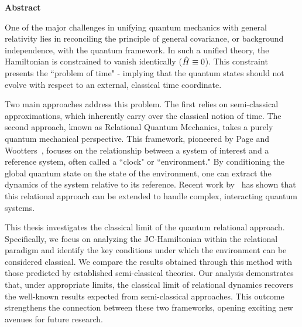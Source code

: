\begin{center}
    {\Large\bfseries\sffamily Abstract}
\end{center}

One of the major challenges in unifying quantum mechanics with general relativity lies in reconciling the principle of general covariance, or background independence, with the quantum framework. In such a unified theory, the Hamiltonian is constrained to vanish identically ($\Hat{H} \equiv 0$). This constraint presents the ``problem of time" -  implying that the quantum states should not evolve with respect to an external, classical time coordinate. 

Two main approaches address this problem. The first relies on semi-classical approximations, which inherently carry over the classical notion of time. The second approach, known as Relational Quantum Mechanics, takes a purely quantum mechanical perspective. This framework, pioneered by Page and Wootters~\cite{page1983evolution}, focuses on the relationship between a system of interest and a reference system, often called a ``clock" or ``environment." By conditioning the global quantum state on the state of the environment, one can extract the dynamics of the system relative to its reference. Recent work by~\cite{Gemsheim:2023izg} has shown that this relational approach can be extended to handle complex, interacting quantum systems.

This thesis investigates the classical limit of the quantum relational approach.  Specifically, we focus on analyzing the JC-Hamiltonian within the relational paradigm and identify the key conditions under which the environment can be considered classical. We compare the results obtained through this method with those predicted by established semi-classical theories. Our analysis demonstrates that, under appropriate limits, the classical limit of relational dynamics recovers the well-known results expected from semi-classical approaches. This outcome strengthens the connection between these two frameworks, opening exciting new avenues for future research.
\newpage
